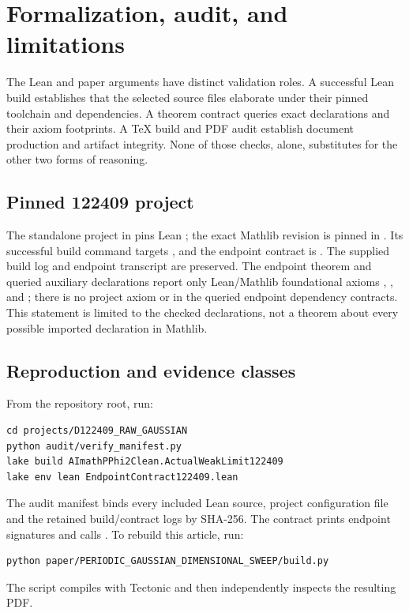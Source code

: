 \section{Formalization, audit, and limitations}\label{sec:evidence}
The Lean and paper arguments have distinct validation roles. A successful Lean build establishes that the selected source files elaborate under their pinned toolchain and dependencies. A theorem contract queries exact declarations and their axiom footprints. A TeX build and PDF audit establish document production and artifact integrity. None of those checks, alone, substitutes for the other two forms of reasoning.

\subsection{Pinned 122409 project}
The standalone project in  pins Lean ; the exact Mathlib revision is pinned in . Its successful build command targets , and the endpoint contract is . The supplied build log and endpoint transcript are preserved. The endpoint theorem and queried auxiliary declarations report only Lean/Mathlib foundational axioms , , and ; there is no project axiom or  in the queried endpoint dependency contracts. This statement is limited to the checked declarations, not a theorem about every possible imported declaration in Mathlib.

\subsection{Reproduction and evidence classes}
From the repository root, run:
\begin{verbatim}
cd projects/D122409_RAW_GAUSSIAN
python audit/verify_manifest.py
lake build AImathPPhi2Clean.ActualWeakLimit122409
lake env lean EndpointContract122409.lean
\end{verbatim}
The audit manifest binds every included Lean source, project configuration file and the retained build/contract logs by SHA-256. The contract prints endpoint signatures and calls . To rebuild this article, run:
\begin{verbatim}
python paper/PERIODIC_GAUSSIAN_DIMENSIONAL_SWEEP/build.py
\end{verbatim}
The script compiles with Tectonic and then independently inspects the resulting PDF.

